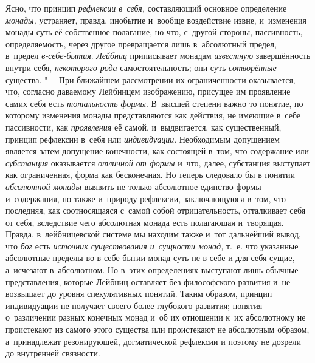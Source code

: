 Ясно, что принцип {\em рефлексии в~себя,} составляющий
основное определение {\em монады,} устраняет, правда,
инобытие и~вообще воздействие извне, и~изменения монады суть её собственное
полагание, но что, с~другой стороны, пассивность, определяемость, через
другое превращается лишь в~абсолютный предел, в~предел
{\em в-себе-бытия}. {\em Лейбниц}
приписывает монадам {\em известную} завершённость
внутри себя, {\em некоторого рода} самостоятельность;
они суть {\em сотворённые} существа. "--- При ближайшем
рассмотрении их ограниченности оказывается, что, согласно даваемому
Лейбницем изображению, присущее им проявление самих себя есть
{\em тотальность формы}. В~высшей степени важно то
понятие, по которому изменения монады представляются как действия, не
имеющие в~себе пассивности, как {\em проявления} её
самой, и~выдвигается, как существенный, принцип рефлексии в~себя или
{\em индивидуации}. Необходимым допущением является
затем допущение конечности, как состоящей в~том, что содержание или
{\em субстанция} оказывается {\em отличной от формы} и~что, далее, субстанция
выступает как ограниченная, форма как бесконечная. Но теперь следовало бы в
понятии {\em абсолютной монады} выявить не только
абсолютное единство формы и~содержания, но также и~природу рефлексии,
заключающуюся в~том, что последняя, как соотносящаяся с~самой собой
отрицательность, отталкивает себя от себя, вследствие чего абсолютная
монада есть полагающая и~творящая. Правда, в~лейбницевской системе мы
находим также и~тот дальнейший вывод, что {\em бог}
есть {\em источник существования и~сущности монад,}
т.~е. что указанные абсолютные пределы во в-себе-бытии монад суть не
в-себе-и-для-себя-сущие, а~исчезают в~абсолютном. Но в~этих определениях
выступают лишь обычные представления, которые Лейбниц оставляет без
философского развития и~не возвышает до уровня спекулятивных понятий. Таким
образом, принцип индивидуации не получает своего более глубокого развития;
понятия о~различении разных конечных монад и~об их отношении к~их
абсолютному не проистекают из самого этого существа или проистекают не
абсолютным образом, а~принадлежат резонирующей, догматической рефлексии и
поэтому не дозрели до внутренней связности.

